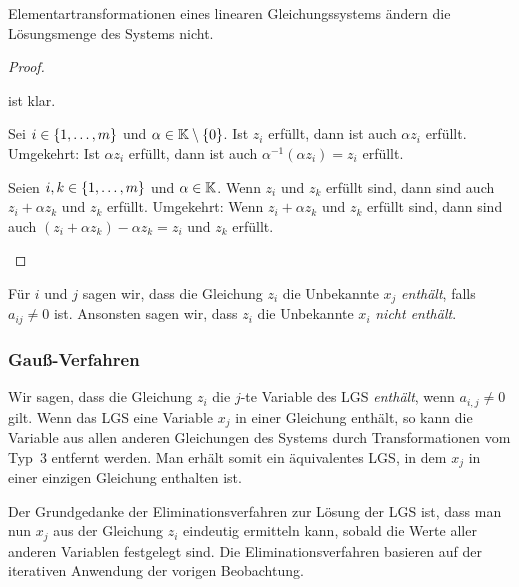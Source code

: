 \begin{propn}
	Elementartransformationen eines linearen Gleichungssystems ändern die Lösungsmenge des Systems nicht.
\end{propn}
\begin{proof} \ 
	\begin{description}[font=\normalfont]
		\item[Typ 1]
			ist klar.
		\item[Typ 2:]
			Sei $ i \in \{ 1,\ldots,m \} $ und $ \alpha \in \mathbb K\setminus\{0\} $.
			Ist $ z_i $ erfüllt, dann ist auch $ \alpha z_i $ erfüllt. Umgekehrt: Ist $ \alpha z_i $ erfüllt, dann ist auch $ \alpha^{-1}\left( \alpha z_i \right) = z_i $ erfüllt.
		\item[Typ 3:]
			Seien $ i,k \in \{ 1,\ldots,m \} $ und $ \alpha \in \mathbb K $. Wenn $ z_i $ und $ z_k $ erfüllt sind, dann sind auch $ z_i + \alpha z_k $ und $ z_k $ erfüllt. Umgekehrt: Wenn $ z_i + \alpha z_k $ und $ z_k $ erfüllt sind, dann sind auch $ (z_i + \alpha z_k ) - \alpha z_k = z_i $ und $ z_k $ erfüllt.\qedhere
	\end{description}
\end{proof}
Für $ i $ und $ j $ sagen wir, dass die Gleichung $ z_i $ die Unbekannte $ x_j $ \textit{enthält}, falls $ a_{ij} \neq 0 $ ist. Ansonsten sagen wir, dass $ z_i $ die Unbekannte $ x_i $ \emph{nicht enthält}.


\subsubsection{Gauß-Verfahren}

Wir sagen, dass die Gleichung $z_i$ die $j$-te Variable des LGS \emph{enthält}, wenn $a_{i,j} \ne 0$ gilt. Wenn das LGS eine Variable $x_{j}$ in einer Gleichung enthält, so kann die Variable aus allen anderen Gleichungen des Systems durch Transformationen vom Typ~3 entfernt werden. Man erhält somit ein äquivalentes LGS, in dem $x_j$ in einer einzigen Gleichung enthalten ist. 

Der Grundgedanke der Eliminationsverfahren zur Lösung der LGS ist, dass man nun $x_j$ aus der Gleichung $z_i$ eindeutig ermitteln kann, sobald die Werte aller anderen Variablen festgelegt sind. Die Eliminationsverfahren basieren auf der iterativen Anwendung der vorigen Beobachtung. 


